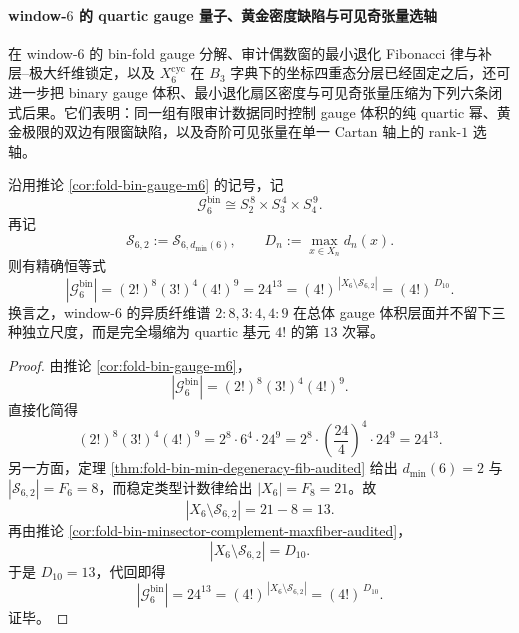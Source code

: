 \paragraph{window-\texorpdfstring{$6$}{6} 的 quartic gauge 量子、黄金密度缺陷与可见奇张量选轴}
在 window-\(6\) 的 bin-fold gauge 分解、审计偶数窗的最小退化 Fibonacci 律与补层--极大纤维锁定，以及 \(X_6^{\mathrm{cyc}}\) 在 \(B_3\) 字典下的坐标四重态分层已经固定之后，还可进一步把 binary gauge 体积、最小退化扇区密度与可见奇张量压缩为下列六条闭式后果。它们表明：同一组有限审计数据同时控制 gauge 体积的纯 quartic 幂、黄金极限的双边有限窗缺陷，以及奇阶可见张量在单一 Cartan 轴上的 rank-\(1\) 选轴。

\begin{theorem}\label{thm:xi-time-part9y-window6-bin-gauge-quartic-collapse}
沿用推论 \ref{cor:fold-bin-gauge-m6} 的记号，记
\[
\mathcal G^{\mathrm{bin}}_6
\cong
S_2^{\,8}\times S_3^{\,4}\times S_4^{\,9}.
\]
再记
\[
\mathcal S_{6,2}:=\mathcal S_{6,d_{\min}(6)},
\qquad
D_n:=\max_{x\in X_n}d_n(x).
\]
则有精确恒等式
\[
|\mathcal G^{\mathrm{bin}}_6|
=
(2!)^8(3!)^4(4!)^9
=
24^{13}
=
(4!)^{\,|X_6\setminus \mathcal S_{6,2}|}
=
(4!)^{\,D_{10}}.
\]
换言之，window-\(6\) 的异质纤维谱 \(2{:}8,3{:}4,4{:}9\) 在总体 gauge 体积层面并不留下三种独立尺度，而是完全塌缩为 quartic 基元 \(4!\) 的第 \(13\) 次幂。
\end{theorem}
\begin{proof}
由推论 \ref{cor:fold-bin-gauge-m6}，
\[
|\mathcal G^{\mathrm{bin}}_6|
=
(2!)^8(3!)^4(4!)^9.
\]
直接化简得
\[
(2!)^8(3!)^4(4!)^9
=
2^8\cdot 6^4\cdot 24^9
=
2^8\cdot \left(\frac{24}{4}\right)^4\cdot 24^9
=
24^{13}.
\]
另一方面，定理 \ref{thm:fold-bin-min-degeneracy-fib-audited} 给出 \(d_{\min}(6)=2\) 与 \(|\mathcal S_{6,2}|=F_6=8\)，而稳定类型计数律给出 \(|X_6|=F_8=21\)。故
\[
|X_6\setminus \mathcal S_{6,2}|=21-8=13.
\]
再由推论 \ref{cor:fold-bin-minsector-complement-maxfiber-audited}，
\[
|X_6\setminus \mathcal S_{6,2}|=D_{10}.
\]
于是 \(D_{10}=13\)，代回即得
\[
|\mathcal G^{\mathrm{bin}}_6|
=
24^{13}
=
(4!)^{\,|X_6\setminus \mathcal S_{6,2}|}
=
(4!)^{\,D_{10}}.
\]
证毕。
\end{proof}

